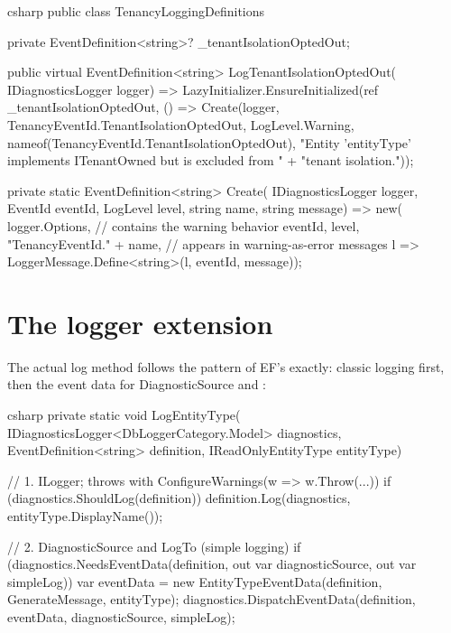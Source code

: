 \begin{sourcecode}{csharp}
public class TenancyLoggingDefinitions
{
    private EventDefinition<string>? _tenantIsolationOptedOut;

    public virtual EventDefinition<string> LogTenantIsolationOptedOut(
        IDiagnosticsLogger logger)
        => LazyInitializer.EnsureInitialized(ref _tenantIsolationOptedOut, () =>
            Create(logger, TenancyEventId.TenantIsolationOptedOut, LogLevel.Warning,
                nameof(TenancyEventId.TenantIsolationOptedOut),
                "Entity '{entityType}' implements ITenantOwned but is excluded from "
                + "tenant isolation."));

    private static EventDefinition<string> Create(
        IDiagnosticsLogger logger, EventId eventId, LogLevel level,
        string name, string message)
        => new(
            logger.Options,                       // contains the warning behavior
            eventId,
            level,
            "TenancyEventId." + name,             // appears in warning-as-error messages
            l => LoggerMessage.Define<string>(l, eventId, message));
}
\end{sourcecode}

\section{The logger extension}

The actual log method follows the pattern of EF's
 exactly: classic logging first, then
the event data for DiagnosticSource and :

\begin{sourcecode}{csharp}
private static void LogEntityType(
    IDiagnosticsLogger<DbLoggerCategory.Model> diagnostics,
    EventDefinition<string> definition,
    IReadOnlyEntityType entityType)
{
    // 1. ILogger; throws with ConfigureWarnings(w => w.Throw(...))
    if (diagnostics.ShouldLog(definition))
        definition.Log(diagnostics, entityType.DisplayName());

    // 2. DiagnosticSource and LogTo (simple logging)
    if (diagnostics.NeedsEventData(definition, out var diagnosticSource, out var simpleLog))
    {
        var eventData = new EntityTypeEventData(definition, GenerateMessage, entityType);
        diagnostics.DispatchEventData(definition, eventData, diagnosticSource, simpleLog);
    }
}
\end{sourcecode}

